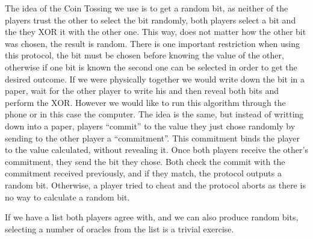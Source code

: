 The idea of the Coin Tossing we use is to get a random bit, as neither of the
  players trust the other to select the bit randomly, both players select a bit
  and the they XOR it with the other one.
This way, does not matter how the other bit was chosen, the result is random.
There is one important restriction when using this protocol, the bit must be
  chosen before knowing the value of  the other, otherwise if one bit is known
  the second one can be selected in order to get the desired outcome.
If we were physically together we would write down the bit in a paper, wait for
  the other player to write his and then reveal both bits and perform the XOR.
However we would like to run this algorithm through the phone or in this case
  the computer.
The idea is the same, but instead of writting down into a paper, players
  ``commit'' to the value they just chose randomly by sending to the other
  player a ``commitment''.
This commitment binds the player to the value calculated, without revealing it.
Once both players receive the other's commitment, they send the bit they chose.
Both check the commit with the commitment received previously, and if they
  match, the protocol outputs a random bit.
Otherwise, a player tried to cheat and the protocol aborts as there is no way to
  calculate a random bit.

If we have a list both players agree with, and we can also produce random bits,
  selecting a number of oracles from the list is a trivial exercise.

